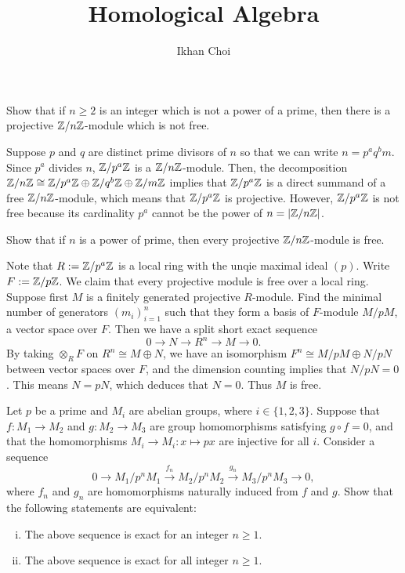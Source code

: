 \documentclass{../../../small}
\begin{document}
\title{Homological Algebra}
\author{Ikhan Choi}
\maketitle

\renewcommand{\theprb}{\arabic{prb}}

\begin{prb}
Show that if $n\ge2$ is an integer which is not a power of a prime, then there is a projective $\mathbb{Z}/n\mathbb{Z}$-module which is not free.
\end{prb}
\begin{sol}
Suppose $p$ and $q$ are distinct prime divisors of $n$ so that we can write $n=p^aq^bm$.
Since $p^a$ divides $n$, $\mathbb{Z}/p^a\mathbb{Z}$ is a $\mathbb{Z}/n\mathbb{Z}$-module.
Then, the decomposition $\mathbb{Z}/n\mathbb{Z}\cong\mathbb{Z}/p^a\mathbb{Z}\oplus\mathbb{Z}/q^b\mathbb{Z}\oplus\mathbb{Z}/m\mathbb{Z}$ implies that $\mathbb{Z}/p^a\mathbb{Z}$ is a direct summand of a free $\mathbb{Z}/n\mathbb{Z}$-module, which means that $\mathbb{Z}/p^a\mathbb{Z}$ is projective.
However, $\mathbb{Z}/p^a\mathbb{Z}$ is not free because its cardinality $p^a$ cannot be the power of $n=|\mathbb{Z}/n\mathbb{Z}|$.
\end{sol}

\begin{prb}
Show that if $n$ is a power of prime, then every projective $\mathbb{Z}/n\mathbb{Z}$-module is free.
\end{prb}
\begin{sol}
Note that $R:=\mathbb{Z}/p^a\mathbb{Z}$ is a local ring with the unqie maximal ideal $(p)$.
Write $F:=\mathbb{Z}/p\mathbb{Z}$.
We claim that every projective module is free over a local ring.
Suppose first $M$ is a finitely generated projective $R$-module.
Find the minimal number of generators $(m_i)_{i=1}^n$ such that they form a basis of $F$-module $M/pM$, a vector space over $F$.
Then we have a split short exact sequence
\[0\to N\to R^n\to M\to0.\]
By taking $\otimes_RF$ on $R^n\cong M\oplus N$, we have an isomorphism $F^n\cong M/pM\oplus N/pN$ between vector spaces over $F$, and the dimension counting implies that $N/pN=0$.
This means $N=pN$, which deduces that $N=0$.
Thus $M$ is free.
\end{sol}

\begin{prb}
Let $p$ be a prime and $M_i$ are abelian groups, where $i\in\{1,2,3\}$.
Suppose that $f:M_1\to M_2$ and $g:M_2\to M_3$ are group homomorphisms satisfying $g\circ f=0$, and that the homomorphisms $M_i\to M_i:x\mapsto px$ are injective for all $i$.
Consider a sequence
\[0\to M_1/p^nM_1\xrightarrow{f_n}M_2/p^nM_2\xrightarrow{g_n}M_3/p^nM_3\to0,\]
where $f_n$ and $g_n$ are homomorphisms naturally induced from $f$ and $g$.
Show that the following statements are equivalent:
\begin{enumerate}[(i)]
\item The above sequence is exact for an integer $n\ge1$.
\item The above sequence is exact for all integer $n\ge1$.
\end{enumerate}
\end{prb}
\begin{sol}
\end{sol}
\end{document}
